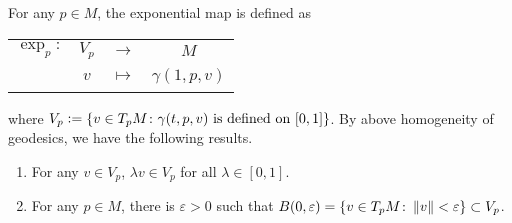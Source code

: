 For any $p \in M$, the exponential map is defined as
\begin{center}
	\begin{tabular}{cccc}
		$\exp_p \colon$ & $V_p$ & $\longrightarrow$ & $M$ \\
		~& $v$ & $\mapsto$ & $\gamma(1,p,v)$
	\end{tabular}
\end{center}
where $V_p \vcentcolon= \left\{v \in T_pM \colon \gamma(t,p,v) \text{ is defined on } [0,1]\right\}$. By above homogeneity of geodesics, we have the following results.
\begin{prop}
	\begin{enumerate}[label=(\arabic{*})]
		\item For any $v \in V_p$, $\lambda v \in V_p$ for all $\lambda \in [0,1]$.
		\item For any $p \in M$, there is $\varepsilon > 0$ such that $B(0,\varepsilon) = \left\{v \in T_pM \colon \left\lVert v\right\lVert < \varepsilon\right\} \subset V_p$.
	\end{enumerate}
\end{prop}

